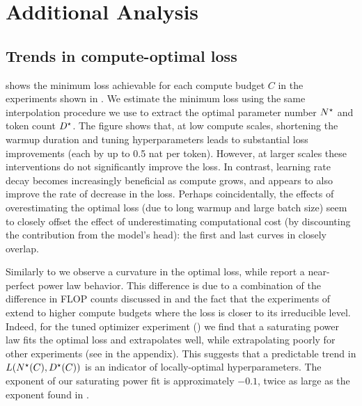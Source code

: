 \documentclass{article}
\theoremstyle{plain}
\theoremstyle{definition}
\theoremstyle{remark}
\newcommand{\maybeSubscript}[1]{
  \ifthenelse{\equal{#1}{}}{}{_{#1}}%
}
\newcommand{\params}[1][]{N\maybeSubscript{#1}}
\newcommand{\paramsStar}[1][]{\params[#1]^{\star}}
\newcommand{\tokens}[1][]{D\maybeSubscript{#1}}
\newcommand{\tokensStar}[1][]{\tokens[#1]^{\star}}
\newcommand{\loss}{L}
\begin{document}
\section{Additional Analysis}\label{sec:additional-analysis}

\subsection{Trends in compute-optimal loss}\label{subsec:compute-optimal-loss}

 shows the minimum loss achievable for each compute budget $C$ in the experiments shown in . We estimate the minimum loss using the same interpolation procedure we use to extract the optimal parameter number $\paramsStar$ and token count $\tokensStar$. The figure shows that, at low compute scales, shortening the warmup duration and tuning hyperparameters leads to substantial loss improvements (each by up to 0.5 nat per token). However, at larger scales these interventions do not significantly improve the loss. In contrast, learning rate decay becomes increasingly beneficial as compute grows, and appears to also improve the rate of decrease in the loss. 
Perhaps coincidentally, the effects of overestimating the optimal loss (due to long warmup and large batch size) seem to closely offset the effect of underestimating computational cost (by discounting the contribution from the model's head): the first and last curves in  closely overlap. 


Similarly to \citet{hoffmann2022empirical} we observe a curvature in the optimal loss, while \citet{kaplan2020scaling} report a near-perfect power law behavior. This difference is due to a combination of the difference in FLOP counts discussed in  and the fact that the experiments of \citet{hoffmann2022empirical} extend to higher compute budgets where the loss is closer to its irreducible level. Indeed, for the tuned optimizer experiment () we find that a saturating power law fits the optimal loss and extrapolates well, while extrapolating poorly for other experiments (see  in the appendix). This suggests that a predictable trend in $\loss(\paramsStar(C), \tokensStar(C))$ is an indicator of locally-optimal hyperparameters. The exponent of our saturating power fit is approximately $-0.1$, twice as large as the exponent found in \citet{kaplan2020scaling}. 
\end{document}
